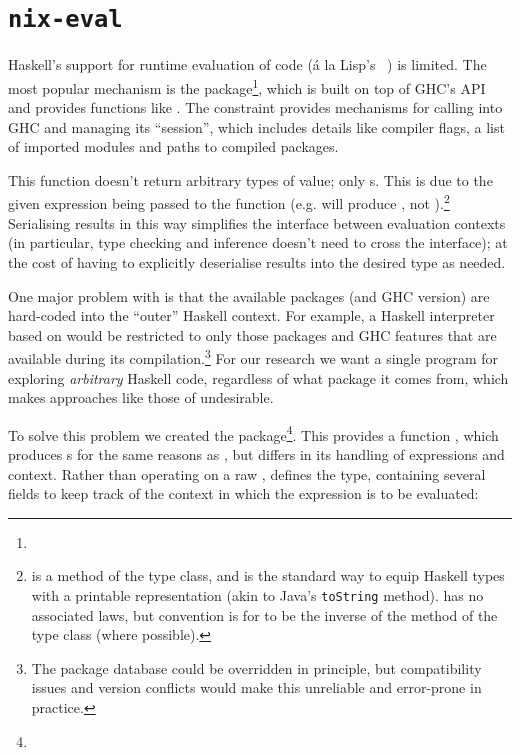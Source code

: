 \section{\texttt{nix-eval}}
\label{sec:nix-eval}

\begin{sloppypar}
  Haskell's support for runtime evaluation of code (\'a la Lisp's
  \eval{}~\cite[\S~1.6]{edwards1962lisp}) is limited. The most popular mechanism
  is the \hint{} package\footnote{}, which is built on top of
  GHC's API and provides functions like
  . The
   constraint provides mechanisms for calling into GHC and
  managing its ``session'', which includes details like compiler flags, a list
  of imported modules and paths to compiled packages.

  This function doesn't return arbitrary types of value; only s. This
  is due to the given expression being passed to the  function (e.g.
   will produce , not
  ).\footnote{ is a method
    of the  type class, and is the standard way to equip Haskell types
    with a printable representation (akin to Java's \texttt{toString} method).
     has no associated laws, but convention is for  to be the
    inverse of the  method of the 
    type class (where possible).} Serialising results in this way simplifies the
  interface between evaluation contexts (in particular, type checking and
  inference doesn't need to cross the interface); at the cost of having to
  explicitly deserialise results into the desired type as needed.

  One major problem with \hint{} is that the available packages
  (and GHC version) are hard-coded into the ``outer'' Haskell context. For
  example, a Haskell interpreter based on \hint{} would be restricted to only
  those packages and GHC features that are available during its
  compilation.\footnote{The package database could be overridden in principle,
    but compatibility issues and version conflicts would make this unreliable
    and error-prone in practice.} For our research we want a single program for
  exploring \emph{arbitrary} Haskell code, regardless of what package it comes
  from, which makes approaches like those of \hint{} undesirable.

  To solve this problem we created the \nixeval{}
  package\footnote{}. This provides a function
  , which produces s for the
  same reasons as \hint{}, but differs in its handling of expressions and
  context. Rather than operating on a raw , \nixeval{} defines the
   type, containing several fields to keep track of the context in
  which the expression is to be evaluated:
\end{sloppypar}

